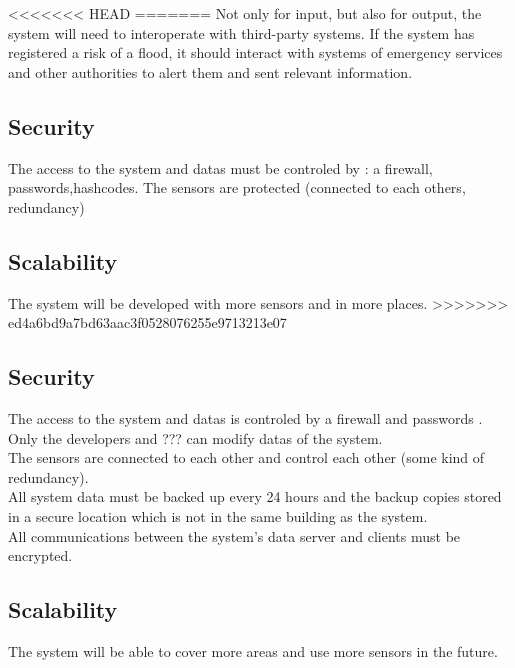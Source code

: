 <<<<<<< HEAD
=======
Not only for input, but also for output, the system will need to interoperate with third-party systems. If the system has registered a risk of a flood, it should interact with systems of emergency services and other authorities to alert them and sent relevant information.

\subsection{Security}
The access to the system and datas must be controled by : a firewall, passwords,hashcodes.
The sensors are protected (connected to each others, redundancy)

\subsection{Scalability}
The system will be developed with more sensors and in more places.
>>>>>>> ed4a6bd9a7bd63aac3f0528076255e9713213e07

\subsection{Security}
The access to the system and datas is controled by a firewall and passwords .\\
Only the developers and ??? can modify datas of the system.\\
The sensors are connected to each other and control each other (some kind of redundancy).\\
All system data must be backed up every 24 hours and the backup copies stored in a secure location which is not in the same building as the system.\\
All communications between the system’s data server and clients must be encrypted.\\

\subsection{Scalability}
The system will be able to cover more areas and use more sensors in the future.

